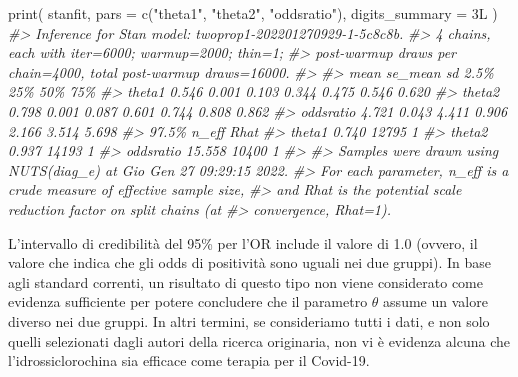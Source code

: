 \documentclass[
  11pt,
]{krantz}
\makeatletter
\newenvironment{Shaded}{\begin{snugshade}}{\end{snugshade}}
\newcommand{\AttributeTok}[1]{\textcolor[rgb]{0.61,0.61,0.61}{#1}}
\newcommand{\CommentTok}[1]{\textcolor[rgb]{0.37,0.37,0.37}{\textit{#1}}}
\newcommand{\FunctionTok}[1]{\textcolor[rgb]{0,0,0}{#1}}
\newcommand{\NormalTok}[1]{#1}
\newcommand{\OtherTok}[1]{\textcolor[rgb]{0.37,0.37,0.37}{#1}}
\newcommand{\SpecialCharTok}[1]{\textcolor[rgb]{0,0,0}{#1}}
\newcommand{\StringTok}[1]{\textcolor[rgb]{0.5,0.5,0.5}{#1}}
\newenvironment{kframe}{%
\medskip{}
\setlength{\fboxsep}{.8em}
 \def\at@end@of@kframe{}%
 \ifinner\ifhmode%
  \def\at@end@of@kframe{\end{minipage}}%
  \begin{minipage}{\columnwidth}%
 \fi\fi%
 \def\FrameCommand##1{\hskip\@totalleftmargin \hskip-\fboxsep
 \colorbox{shadecolor}{##1}\hskip-\fboxsep
     \hskip-\linewidth \hskip-\@totalleftmargin \hskip\columnwidth}%
 \MakeFramed {\advance\hsize-\width
   \@totalleftmargin\z@ \linewidth\hsize
   \@setminipage}}%
 {\par\unskip\endMakeFramed%
 \at@end@of@kframe}
\renewenvironment{Shaded}{\begin{kframe}}{\end{kframe}}
\theoremstyle{definition}
\theoremstyle{definition}
\theoremstyle{definition}
\theoremstyle{definition}
\theoremstyle{remark}
\makeatother
\begin{document}
\begin{Shaded}
\end{Shaded}

\begin{Shaded}
\begin{Highlighting}[]
\FunctionTok{print}\NormalTok{(}
\NormalTok{  stanfit,}
  \AttributeTok{pars =} \FunctionTok{c}\NormalTok{(}\StringTok{"theta1"}\NormalTok{, }\StringTok{"theta2"}\NormalTok{, }\StringTok{"oddsratio"}\NormalTok{),}
  \AttributeTok{digits\_summary =}\NormalTok{ 3L}
\NormalTok{)}
\CommentTok{\#\textgreater{} Inference for Stan model: twoprop1{-}202201270929{-}1{-}5c8c8b.}
\CommentTok{\#\textgreater{} 4 chains, each with iter=6000; warmup=2000; thin=1; }
\CommentTok{\#\textgreater{} post{-}warmup draws per chain=4000, total post{-}warmup draws=16000.}
\CommentTok{\#\textgreater{} }
\CommentTok{\#\textgreater{}            mean se\_mean    sd  2.5\%   25\%   50\%   75\%}
\CommentTok{\#\textgreater{} theta1    0.546   0.001 0.103 0.344 0.475 0.546 0.620}
\CommentTok{\#\textgreater{} theta2    0.798   0.001 0.087 0.601 0.744 0.808 0.862}
\CommentTok{\#\textgreater{} oddsratio 4.721   0.043 4.411 0.906 2.166 3.514 5.698}
\CommentTok{\#\textgreater{}            97.5\% n\_eff Rhat}
\CommentTok{\#\textgreater{} theta1     0.740 12795    1}
\CommentTok{\#\textgreater{} theta2     0.937 14193    1}
\CommentTok{\#\textgreater{} oddsratio 15.558 10400    1}
\CommentTok{\#\textgreater{} }
\CommentTok{\#\textgreater{} Samples were drawn using NUTS(diag\_e) at Gio Gen 27 09:29:15 2022.}
\CommentTok{\#\textgreater{} For each parameter, n\_eff is a crude measure of effective sample size,}
\CommentTok{\#\textgreater{} and Rhat is the potential scale reduction factor on split chains (at }
\CommentTok{\#\textgreater{} convergence, Rhat=1).}
\end{Highlighting}
\end{Shaded}

L'intervallo di credibilità del 95\% per l'OR include il valore di 1.0 (ovvero, il valore che indica che gli odds di positività sono uguali nei due gruppi). In base agli standard correnti, un risultato di questo tipo non viene considerato come evidenza sufficiente per potere concludere che il parametro \(\theta\) assume un valore diverso nei due gruppi. In altri termini, se consideriamo tutti i dati, e non solo quelli selezionati dagli autori della ricerca originaria, non vi è evidenza alcuna che l'idrossiclorochina sia efficace come terapia per il Covid-19.
\end{document}
